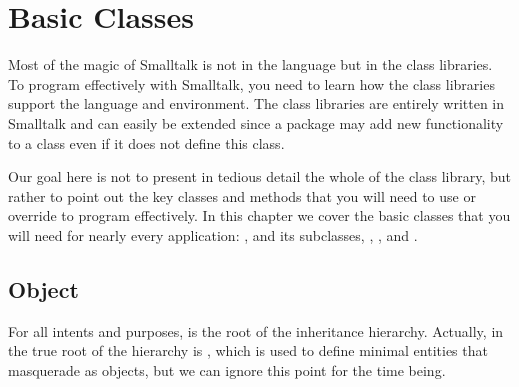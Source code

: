 \documentclass[a4paper,10pt,twoside]{book}
\begin{document}
	\renewcommand{\nnbb}[2]{} %
	\sloppy
\fi
\chapter{Basic Classes}

Most of the magic of Smalltalk is not in the language but in the class libraries. To program effectively with Smalltalk, you need to learn how the class libraries support the language and environment. The class libraries are entirely written in Smalltalk and can easily be extended since a package may add new functionality to a class even if it does not define this class. 

Our goal here is not to present in tedious detail the whole of the \pharo class library, but rather to point out the key classes and methods that you will need to use or override to program effectively. In this chapter we cover the basic classes that you will need for nearly every application: ,  and its subclasses, , ,  and .


\section{Object}
For all intents and purposes,  is the root of the inheritance hierarchy. Actually, in \pharo the true root of the hierarchy is , which is used to define minimal entities that masquerade as objects, but we can ignore this point for the time being.
\end{document}
